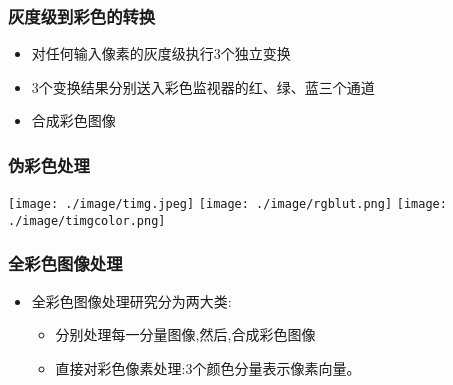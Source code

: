 \documentclass{beamer}
\begin{document}
\begin{frame}
\frametitle{灰度级到彩色的转换}
\label{sec-4-4}

\begin{itemize}
\item 对任何输入像素的灰度级执行3个独立变换
\item 3个变换结果分别送入彩色监视器的红、绿、蓝三个通道
\item 合成彩色图像
\end{itemize}
\end{frame}
\begin{frame}
\frametitle{伪彩色处理}
\label{sec-4-5}

\texttt{[image: ./image/timg.jpeg]}
\texttt{[image: ./image/rgblut.png]}
\texttt{[image: ./image/timgcolor.png]}
\end{frame}
\begin{frame}
\frametitle{全彩色图像处理}
\label{sec-4-6}

\begin{itemize}
\item 全彩色图像处理研究分为两大类:
\begin{itemize}
\item 分别处理每一分量图像,然后,合成彩色图像
\item 直接对彩色像素处理:3个颜色分量表示像素向量。
\end{itemize}
\end{itemize}
\end{frame}
\end{document}
